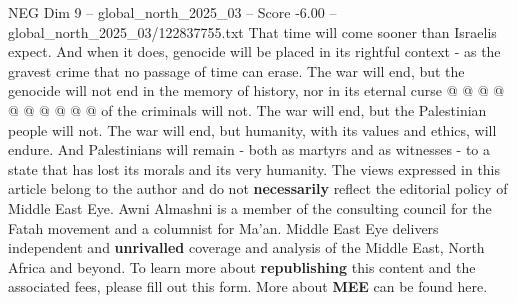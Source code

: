 \begin{textsample}{NEG Dim 9 – global\_north\_2025\_03 – Score -6.00 – global\_north\_2025\_03/122837755.txt}
That time will come sooner than Israelis expect.
And when it does, genocide will be placed in its rightful context - as the gravest crime that no passage of time can erase.
The war will end, but the genocide will not end in the memory of history, nor in its eternal curse @ @ @ @ @ @ @ @ @ @ of the criminals will not.
The war will end, but the Palestinian people will not.
The war will end, but humanity, with its values and ethics, will endure.
And Palestinians will remain - both as martyrs and as witnesses - to a state that has lost its morals and its very humanity.
The views expressed in this article belong to the author and do not \textbf{necessarily} reflect the editorial policy of Middle East Eye.
Awni Almashni is a member of the consulting council for the Fatah movement and a columnist for Ma'an.
Middle East Eye delivers independent and \textbf{unrivalled} coverage and analysis of the Middle East, North Africa and beyond.
To learn more about \textbf{republishing} this content and the associated fees, please fill out this form.
More about \textbf{MEE} can be found here.

\end{textsample}
